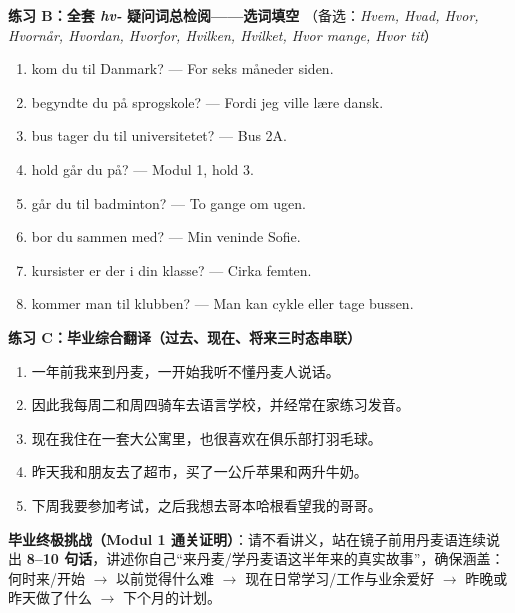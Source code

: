 \textbf{练习 B：全套 \textit{hv-} 疑问词总检阅——选词填空}
（备选：\textit{Hvem, Hvad, Hvor, Hvornår, Hvordan, Hvorfor, Hvilken, Hvilket, Hvor mange, Hvor tit}）
\begin{enumerate}
  \item \underline{\hspace{2.4cm}} kom du til Danmark? --- For seks måneder siden.
  \item \underline{\hspace{2.4cm}} begyndte du på sprogskole? --- Fordi jeg ville lære dansk.
  \item \underline{\hspace{2.4cm}} bus tager du til universitetet? --- Bus 2A.
  \item \underline{\hspace{2.4cm}} hold går du på? --- Modul 1, hold 3.
  \item \underline{\hspace{2.4cm}} går du til badminton? --- To gange om ugen.
  \item \underline{\hspace{2.4cm}} bor du sammen med? --- Min veninde Sofie.
  \item \underline{\hspace{2.4cm}} kursister er der i din klasse? --- Cirka femten.
  \item \underline{\hspace{2.4cm}} kommer man til klubben? --- Man kan cykle eller tage bussen.
\end{enumerate}

\textbf{练习 C：毕业综合翻译（过去、现在、将来三时态串联）}
\begin{enumerate}
  \item 一年前我来到丹麦，一开始我听不懂丹麦人说话。
  \item 因此我每周二和周四骑车去语言学校，并经常在家练习发音。
  \item 现在我住在一套大公寓里，也很喜欢在俱乐部打羽毛球。
  \item 昨天我和朋友去了超市，买了一公斤苹果和两升牛奶。
  \item 下周我要参加考试，之后我想去哥本哈根看望我的哥哥。
\end{enumerate}


\textbf{毕业终极挑战（Modul 1 通关证明）}：请不看讲义，站在镜子前用丹麦语连续说出 \textbf{8--10 句话}，讲述你自己“来丹麦/学丹麦语这半年来的真实故事”，确保涵盖：何时来/开始 $\rightarrow$ 以前觉得什么难 $\rightarrow$ 现在日常学习/工作与业余爱好 $\rightarrow$ 昨晚或昨天做了什么 $\rightarrow$ 下个月的计划。

